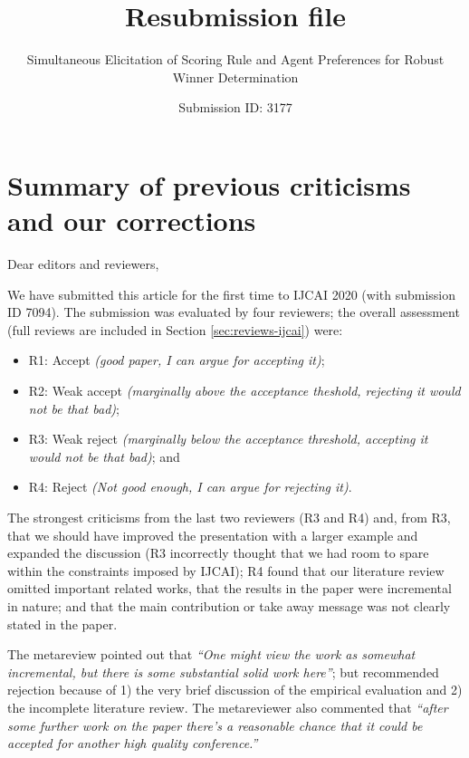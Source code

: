 \documentclass[version=3.21, pagesize, twoside=off, bibliography=totoc, DIV=calc, fontsize=12pt, a4paper]{scrartcl}
\title{Resubmission file}
\subtitle{Simultaneous Elicitation of Scoring Rule and Agent Preferences for Robust Winner Determination}
\author{Submission ID: 3177}
\date{}
\begin{document}
\maketitle

\tableofcontents

\section{Summary of previous criticisms and our corrections}
Dear editors and reviewers,

\medskip
We have submitted this article for the first time to IJCAI 2020 (with submission ID 7094). The submission was evaluated by four reviewers; the overall assessment (full reviews are included in Section \ref{sec:reviews-ijcai}) were: 
\begin{itemize}
\item R1: Accept {\em (good paper, I can argue for accepting it)};
\item R2: Weak accept {\em (marginally above the acceptance theshold, rejecting it would not be that bad)};
\item R3: Weak reject {\em (marginally below the acceptance threshold, accepting it would not be that bad)}; and
\item R4:  Reject {\em (Not good enough, I can argue for rejecting it)}.
\end{itemize}

The strongest criticisms from the last two reviewers (R3 and R4) and, from R3, that we should have improved the presentation with a larger example and expanded the discussion (R3 incorrectly thought that we had room to spare within the constraints imposed by IJCAI);  R4 found that our literature review omitted important related works, that the results in the paper were incremental in nature; and that the main contribution or take away message was not clearly stated in the paper. 

The metareview pointed out that {\em “One might view the work as somewhat incremental, but there is some substantial solid work here”}; but recommended rejection because of 1) the very brief discussion of the empirical evaluation and 2) the incomplete literature review. The metareviewer also commented that {\em “after some further work on the paper there's a reasonable chance that it could be accepted for another high quality conference.”}
\end{document}
